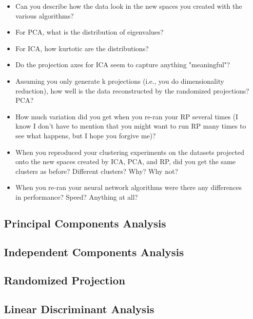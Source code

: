 \begin{itemize}
        \item Can you describe how the data look in the new spaces you created with the various algorithms?
        \item  For PCA, what is the distribution of eigenvalues?
        \item For ICA, how kurtotic are the distributions?
        \item Do the projection axes for ICA seem to capture anything "meaningful"?
        \item Assuming you only generate k projections (i.e., you do dimensionality reduction), how well is the data reconstructed by the randomized projections? PCA?
        \item How much variation did you get when you re-ran your RP several times (I know I don't have to mention that you might want to run RP many times to see what happens, but I hope you forgive me)?
        \item When you reproduced your clustering experiments on the datasets projected onto the new spaces created by ICA, PCA, and RP, did you get the same clusters as before? Different clusters? Why? Why not?
        \item When you re-ran your neural network algorithms were there any differences in performance? Speed? Anything at all?
    \end{itemize}

    \subsection{Principal Components Analysis}\label{subsec:principal-components-analysis}


    \subsection{Independent Components Analysis}\label{subsec:independent-components-analysis}

    \subsection{Randomized Projection}\label{subsec:randomized-projection}

    \subsection{Linear Discriminant Analysis}\label{subsec:linear-discriminant-analysis}